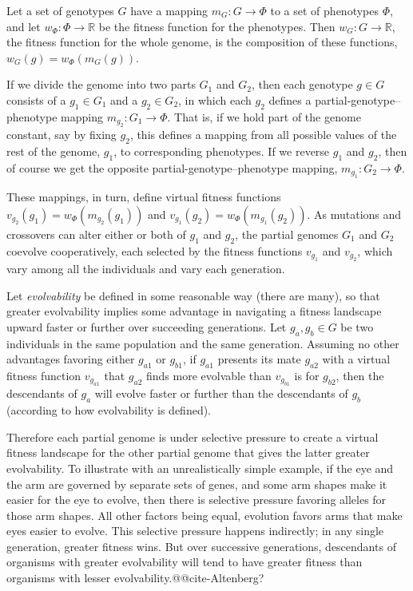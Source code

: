 \documentclass[letterpaper]{article}
\begin{document}
Let a set of genotypes $G$ have a mapping $m_{G} : G \rightarrow \Phi$ to a set
of phenotypes $\Phi$, and let $w_\Phi : \Phi \rightarrow \mathbb{R}$ be the
fitness function for the phenotypes. Then $w_G : G \rightarrow \mathbb{R}$, the
fitness function for the whole genome, is the composition of these functions,
$w_G(g) = w_\Phi(m_{G}(g))$.

If we divide the genome into two parts $G_1$ and $G_2$, then each genotype $g
\in G$ consists of a $g_1 \in G_1$ and a $g_2 \in G_2$, in which each $g_2$
defines a partial-genotype--phenotype mapping $m_{g_2} : G_1 \rightarrow
\Phi$. That is, if we hold part of the genome constant, say by fixing $g_2$,
this defines a mapping from all possible values of the rest of the genome,
$g_1$, to corresponding phenotypes. If we reverse $g_1$ and $g_2$, then of
course we get the opposite partial-genotype--phenotype mapping, $m_{g_1} : G_2
\rightarrow \Phi$.

These mappings, in turn, define virtual fitness functions $v_{g_2}(g_1) =
w_\Phi(m_{g_2}(g_1))$ and $v_{g_1}(g_2) = w_\Phi(m_{g_1}(g_2))$. As mutations
and crossovers can alter either or both of $g_1$ and $g_2$, the partial
genomes $G_1$ and $G_2$ coevolve cooperatively, each selected by
the fitness functions $v_{g_1}$ and $v_{g_2}$, which vary among all the
individuals and vary each generation.

Let \textit{evolvability} be defined in some reasonable way (there are many),
so that greater evolvability implies some advantage in navigating a fitness
landscape upward faster or further over succeeding generations. Let $g_a,g_b
\in G$ be two individuals in the same population and the same generation.
Assuming no other advantages favoring either $g_{a1}$ or $g_{b1}$, if $g_{a1}$
presents its mate $g_{a2}$ with a virtual fitness function $v_{g_{a1}}$ that
$g_{a2}$ finds more evolvable than $v_{g_{b1}}$ is for $g_{b2}$, then the
descendants of $g_a$ will evolve faster or further than the descendants of
$g_b$ (according to how evolvability is defined).

Therefore each partial genome is under selective pressure to create a virtual
fitness landscape for the other partial genome that gives the latter greater
evolvability. To illustrate with an unrealistically simple example, if the eye
and the arm are governed by separate sets of genes, and some arm shapes make
it easier for the eye to evolve, then there is selective pressure favoring
alleles for those arm shapes. All other factors being equal, evolution favors
arms that make eyes easier to evolve. This selective pressure happens
indirectly; in any single generation, greater fitness wins. But over successive
generations, descendants of organisms with greater evolvability will tend to
have greater fitness than organisms with lesser evolvability.@@cite-Altenberg?
\end{document}
